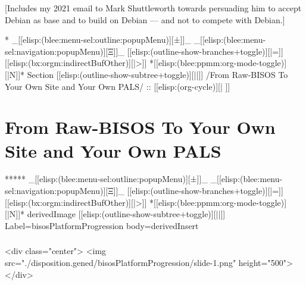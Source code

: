 \begin{whenOrg}
\begin{verblatex}
\begin{frame}[fragile,plain,label=citation_debuntu]
    \bigskip

[Includes my 2021 email to Mark Shuttleworth towards persuading him to accept Debian as base and to build on Debian --- and not to compete with Debian.]


\end{frame}
\end{verblatex}



\begin{whenOrg}
*  _[[elisp:(blee:menu-sel:outline:popupMenu)][±]]_ _[[elisp:(blee:menu-sel:navigation:popupMenu)][Ξ]]_ [[elisp:(outline-show-branches+toggle)][|=]] [[elisp:(bx:orgm:indirectBufOther)][|>]] *[[elisp:(blee:ppmm:org-mode-toggle)][|N]]*  Section    [[elisp:(outline-show-subtree+toggle)][||]]   /From Raw-BISOS To Your Own Site and Your Own PALS/ ::  [[elisp:(org-cycle)][| ]]
\end{whenOrg}

\section{From Raw-BISOS To Your Own Site and Your Own PALS}


\begin{whenOrg}
*****  _[[elisp:(blee:menu-sel:outline:popupMenu)][±]]_ _[[elisp:(blee:menu-sel:navigation:popupMenu)][Ξ]]_ [[elisp:(outline-show-branches+toggle)][|=]] [[elisp:(bx:orgm:indirectBufOther)][|>]] *[[elisp:(blee:ppmm:org-mode-toggle)][|N]]*  derivedImage [[elisp:(outline-show-subtree+toggle)][||]] Label=bisosPlatformProgression  body=derivedInsert
\end{whenOrg}

\begin{htmlonly}

\begin{frame}[fragile,plain,label=bisosPlatformProgression]
    \frametitle{}
    \framesubtitle{}
    \begin{rawhtml}
<div class="center">
<img src="./disposition.gened/bisosPlatformProgression/slide-1.png" height="500">
</div>
    \end{rawhtml}
\end{frame}
\end{htmlonly}


\end{whenOrg}
